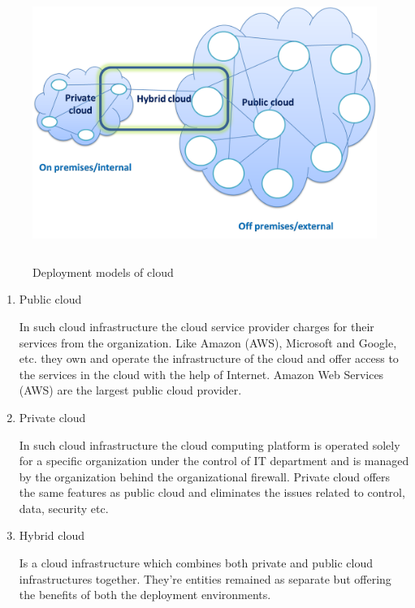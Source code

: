     \begin{figure}[h]
        \centering
        \includegraphics[width=13cm,height=9cm]{images/types_of_cloud.png}
        \caption{Deployment models of cloud}
    \end{figure}
    
    \par
    \begin{enumerate}
    
    \item Public cloud  
    \par
    In such cloud infrastructure the cloud service provider charges for their services from the organization. Like Amazon (AWS), Microsoft and Google, etc. they own and operate the infrastructure of the cloud and offer access to the services in the cloud with the help of Internet. Amazon Web Services (AWS) are the largest public cloud provider\cite{deploy}.
    
    \item Private cloud
    \par
    In such cloud infrastructure the cloud computing platform is operated solely for a specific organization under the control of IT department and is managed by the organization behind the organizational firewall. Private cloud offers the same features as public cloud and eliminates the issues related to control, data, security etc\cite{deploy}.
    
    \item Hybrid cloud
    \par
    Is a cloud infrastructure which combines both private and public cloud infrastructures together. They're entities remained as separate but offering the benefits of both the deployment environments\cite{deploy}.
    \end{enumerate}
    
